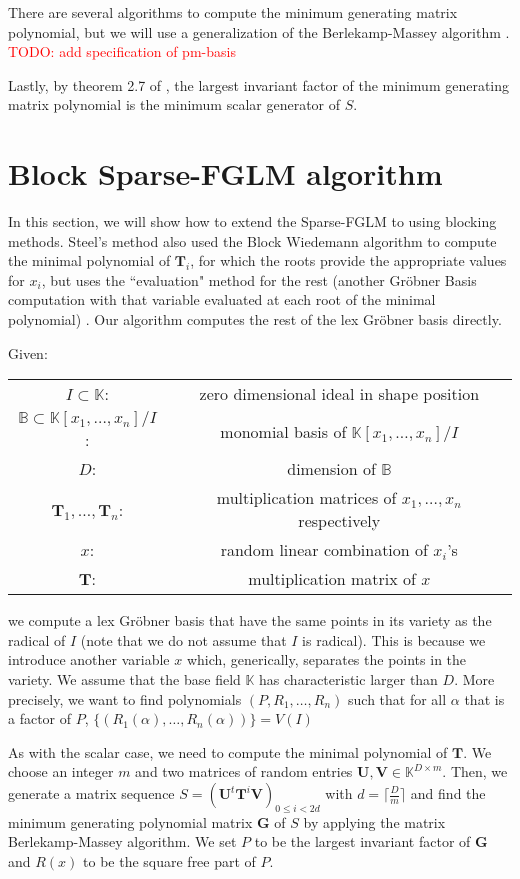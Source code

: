 \documentclass[12pt]{article}
\def\K {\ensuremath{\mathbb{K}}}
\def\K{\mathbb{K}}
\def\mG{\mathbf{G}}
\def\mT{\mathbf{T}}
\def\mU{\mathbf{U}}
\def\mV{\mathbf{V}}
\begin{document}
There are several algorithms to compute the minimum generating
matrix polynomial, but we will use a generalization
of the Berlekamp-Massey algorithm \cite{Coppersmith93}.
\textcolor{red}{TODO: add specification of pm-basis}

Lastly, by theorem 2.7 of \cite{KaYu06}, the largest 
invariant factor of the minimum generating
matrix polynomial is the minimum scalar generator
of $S$.


\newpage
\section{Block Sparse-FGLM algorithm}
In this section, we will show how to extend the Sparse-FGLM
to using blocking methods. Steel's method also used the
Block Wiedemann algorithm to compute the minimal polynomial
of $\mT_i$, for which the roots provide the appropriate
values for $x_i$,
but uses the ``evaluation" method for the rest
(another Gr\"obner Basis computation with that variable
evaluated at each root of the minimal polynomial) \cite{Steel15}.
Our algorithm computes the rest of the lex
Gr\"obner basis directly.

Given:
\begin{center}
	\begin{tabular}{c c}
		$I \subset \mathbb{K}$:& zero dimensional ideal
		in shape position\\
		$\mathbb{B} \subset \mathbb{K}[x_1,\dots,x_n]/I$:&
		monomial basis of $\mathbb{K}[x_1,\dots,x_n]/I$\\
		$D$: & dimension of $\mathbb{B}$\\
		$\mT_1, \dots,\mT_n$:& multiplication matrices of
		$x_1 ,\dots,x_n$ respectively\\
		$x$:& random linear combination of $x_i$'s\\
		$\mT$:& multiplication matrix of $x$
	\end{tabular}
\end{center}
we compute a lex Gr\"obner basis that have the same points
in its variety as the radical of $I$ 
(note that we do not assume that $I$ is radical).
This is because we introduce another variable $x$ which,
generically, separates the points in the variety.
We assume that the base field $\K$ has characteristic
larger than $D$. More precisely, we want to find polynomials
$(P,R_1,\dots,R_n)$ such that for all $\alpha$ that is a factor of
$P$, $\{ (R_1(\alpha),\dots,R_n(\alpha)) \} = V(I)$

As with the scalar case, we need to compute the minimal polynomial
of $\mT$. We choose an integer $m$ and two matrices of random
entries $\mU,\mV \in \K^{D\times m}$. Then, we generate a matrix
sequence $S = (\mU^{t}\mT^i\mV)_{0 \le i < 2d}$ with
$d = \lceil \frac{D}{m} \rceil$ and find the minimum generating
polynomial matrix $\mG$ of $S$ by applying the matrix
Berlekamp-Massey algorithm. We set $P$ to be the largest
invariant factor of $\mG$ and $R(x)$ to
be the square free part of $P$.
\end{document}
